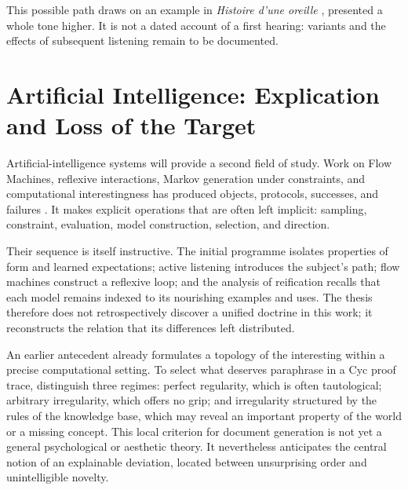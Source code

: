 \documentclass[11pt,a4paper]{article}
\begin{document}
This possible path draws on an example in \emph{Histoire d'une oreille}
\parencite[119--120]{pachet2018oreille}, presented a whole tone higher.
It is not a dated account of a first hearing: variants and the effects of
subsequent listening remain to be documented.

\section{Artificial Intelligence: Explication and Loss of the Target}

Artificial-intelligence systems will provide a second field of study. Work on Flow
Machines, reflexive interactions, Markov generation under constraints, and
computational interestingness has produced objects, protocols, successes, and
failures
\parencite{pachet1999surprising,pachet1999active,pachet1999programs,pachet2000melodie,
pachet2002continuatorinteraction,pachet2004flowmachines,pachet2004reification,
pachet2004cybernetic,pachet2004childrenreflect,addessi2005experiments,
pachet2006clefs,pachet2006creativity,pachet2006reflective,pachet2008machines,
jones2009stimulating,pachet2006interactionsreflexives,addessi2006flowmachine,
aucouturier2002similarity,pachetroy2008hitsong,pachet2011hitsong,
lerch2011closedloop,
milipachet1995regularity,pachet2012virtuosity,martin2016creativeprocess,
pachet2021assisted,pachet2026markov}.
It makes explicit operations that are often left implicit: sampling,
constraint, evaluation, model construction, selection, and direction.

Their sequence is itself instructive. The initial programme isolates properties
of form and learned expectations; active listening introduces the subject's
path; flow machines construct a reflexive loop; and the analysis of reification
recalls that each model remains indexed to its nourishing examples and uses. The
thesis therefore does not retrospectively discover a unified doctrine in this
work; it reconstructs the relation that its differences left distributed.

An earlier antecedent already formulates a topology of the interesting within a
precise computational setting. To select what deserves paraphrase in a Cyc proof
trace, \textcite{milipachet1995regularity} distinguish three regimes: perfect
regularity, which is often tautological; arbitrary irregularity, which offers no
grip; and irregularity structured by the rules of the knowledge base, which may
reveal an important property of the world or a missing concept. This local
criterion for document generation is not yet a general psychological or
aesthetic theory. It nevertheless anticipates the central notion of an
explainable deviation, located between unsurprising order and unintelligible
novelty.
\end{document}
